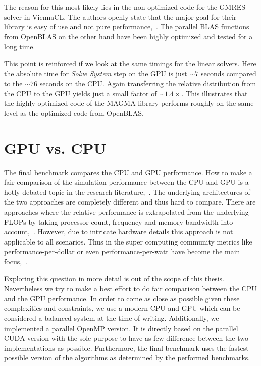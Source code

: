The reason for this most likely lies in the non-optimized code for the GMRES solver in ViennaCL. The authors openly state that the major goal for their library is easy of use and not pure performance,~\cite{ViennaCLRupp2010}. The parallel BLAS functions from OpenBLAS on the other hand have been highly optimized and tested for a long time.

This point is reinforced if we look at the same timings for the linear solvers. Here the absolute time for \emph{Solve System} step on the GPU is just ${\sim}7$ seconds compared to the ${\sim}76$ seconds on the CPU. Again transferring the relative distribution from the CPU to the GPU yields just a small factor of ${\sim}1.4×$. This illustrates that the highly optimized code of the MAGMA library performs roughly on the same level as the optimized code from OpenBLAS.

\section{GPU vs. CPU}

The final benchmark compares the CPU and GPU performance. How to make a fair comparison of the simulation performance between the CPU and GPU is a hotly debated topic in the research literature,~\cite{Gregg2011}\cite{Lee2010}. The underlying architectures of the two approaches are completely different and thus hard to compare. There are approaches where the relative performance is extrapolated from the underlying FLOPs by taking processor count, frequency and memory bandwidth into account,~\cite{Lee2010}. However, due to intricate hardware details this approach is not applicable to all scenarios. Thus in the super computing community metrics like performance-per-dollar or even performance-per-watt have become the main focus,~\cite{Kamil2008}.

Exploring this question in more detail is out of the scope of this thesis. Nevertheless we try to make a best effort to do fair comparison between the CPU and the GPU performance. In order to come as close as possible given these complexities and constraints, we use a modern CPU and GPU which can be considered a balanced system at the time of writing. Additionally, we implemented a parallel OpenMP version. It is directly based on the parallel CUDA version with the sole purpose to have as few difference between the two implementations as possible. Furthermore, the final benchmark uses the fastest possible version of the algorithms as determined by the performed benchmarks.

